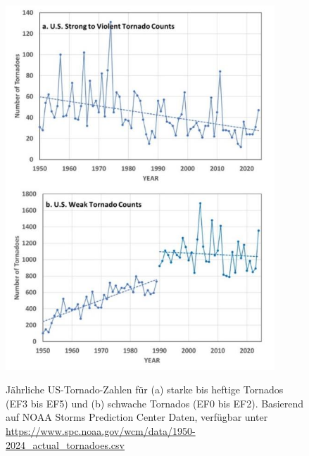 \documentclass[12pt,paper=a4,DIV=12,parskip=never,chapterprefix=false,headings=standardclasses]{scrreprt}
\begin{document}
\begin{figure}[H]
\begin{center}
\includegraphics[width=0.9\textwidth]{bilder/bilderKlima-0060.jpg}\\[1cm]
\end{center}
\caption{Jährliche US-Tornado-Zahlen für (a) starke bis heftige Tornados (EF3 bis EF5) und (b) schwache Tornados (EF0 bis EF2). Basierend auf NOAA Storms Prediction Center Daten, verfügbar unter \url{https://www.spc.noaa.gov/wcm/data/1950-2024_actual_tornadoes.csv}}
\end{figure}
\end{document}
